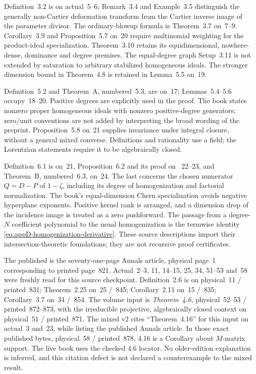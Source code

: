 Definition~3.2 is on actual~5--6; Remark~3.4 and Example~3.5
distinguish the generally non-Cartier deformation transform
from the Cartier inverse image of the parameter divisor.
The ordinary-blowup formula is Theorem~3.7 on~7--9.
Corollary~3.9 and Proposition~5.7 on~20 require multinomial
weighting for the product-ideal specialization. Theorem~3.10
retains its equidimensional, nowhere-dense, dominance and
degree premises. The equal-degree graph Setup~3.11 is not
extended by saturation to arbitrary stabilized homogeneous
ideals. The stronger dimension bound in Theorem~4.8 is
retained in Lemma~5.5 on~19.

Definition~5.2 and Theorem~A, numbered~5.3, are on~17;
Lemmas~5.4--5.6 occupy~18--20. Positive degrees are explicitly
used in the proof. The book states nonzero proper homogeneous
ideals with nonzero positive-degree generators; zero/unit
conventions are not added by interpreting the broad wording
of the preprint. Proposition~5.8 on~21 supplies invariance
under integral closure, without a general mixed converse.
Definitions and rationality use a field; the Lorentzian
statements require it to be algebraically closed.

Definition~6.1 is on~21, Proposition~6.2 and its proof on
~22--23, and Theorem~B, numbered~6.3, on~24. The last concerns
the chosen numerator $Q=D-P$ of $1-\zeta$, including its
degree of homogenization and factorial normalization.
The book's equal-dimension Chern specialization avoids
negative hyperplane exponents. Positive kernel rank is
arranged, and a dimension drop of the incidence image is
treated as a zero pushforward. The passage from a degree-$N$
coefficient polynomial to the usual homogenization is the
termwise identity \eqref{eq:appD-homogenization-derivative}.
These source descriptions import their intersection-theoretic
foundations; they are not recursive proof certificates.

The published \cite{BrandenHuh20Lorentzian} is the
seventy-one-page Annals article, physical page~1 corresponding
to printed page~821. Actual~2--3, 11, 14--15, 25, 34,
51--53 and~58 were freshly read for this source checkpoint.
Definition~2.6 is on physical~11 / printed~831;
Theorem~2.25 on~25 /~845; Corollary~2.11 on~15 /~835;
Corollary~3.7 on~34 /~854.
The volume input is \emph{Theorem~4.6}, physical~52--53 /
printed~872--873, with the irreducible projective,
algebraically closed context on physical~51 / printed~871.
The mixed v2 cites ``Theorem~4.16'' for this input on
actual~3 and~23, while listing the published Annals article.
In those exact published bytes, physical~58 / printed~878,
4.16 is a Corollary about $M$-matrix support. The live book
uses the checked 4.6 locator. No older-edition explanation
is inferred, and this citation defect is not declared a
counterexample to the mixed result.

